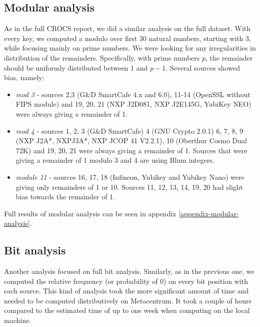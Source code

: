 \subsection{Modular analysis}

As in the full CROCS report\cite{svenda_full}, we did a similar analysis on the full dataset. With every key, we computed a modulo over first 30 natural numbers, starting with 3, while focusing mainly on prime numbers. We were looking for any irregularities in distribution of the remainders. Specifically, with prime numbers $p$, the remainder should be uniformly distributed between 1 and $p-1$. Several sources showed bias, namely:

\begin{itemize}

\item \textit{mod 3} - sources 2,3 (G\&D SmartCafe 4.x and 6.0), 11-14 (OpenSSL without FIPS module) and 19, 20, 21 (NXP J2D081, NXP J2E145G, YubiKey NEO) were always giving a remainder of 1.

\item \textit{mod 4} - sources 1, 2, 3 (G\&D SmartCafe) 4 (GNU Crypto 2.0.1) 6, 7, 8, 9 (NXP J2A*, NXPJ3A*, NXP JCOP 41 V2.2.1), 10 (Oberthur Cosmo Dual 72K) and 19, 20, 21 were always giving a remainder of 1. Sources that were giving a remainder of 1 modulo 3 and 4 are using Blum integers.

\item \textit{module 11} - sources 16, 17, 18 (Infineon, Yubikey and Yubikey Nano) were giving only remainders of 1 or 10. Sources 11, 12, 13, 14, 19, 20 had slight bias towards the remainder of 1.

\end{itemize}

\noindent
Full results of modular analysis can be seen in appendix \ref{appendix-modular-analysis}.

\subsection{Bit analysis}

Another analysis focused on full bit analysis. Similarly, as in the previous one, we computed the relative frequency (or probability of 0) on every bit position with each source. This kind of analysis took the more significant amount of time and needed to be computed distributively on Metacentrum. It took a couple of hours compared to the estimated time of up to one week when computing on the local machine.

